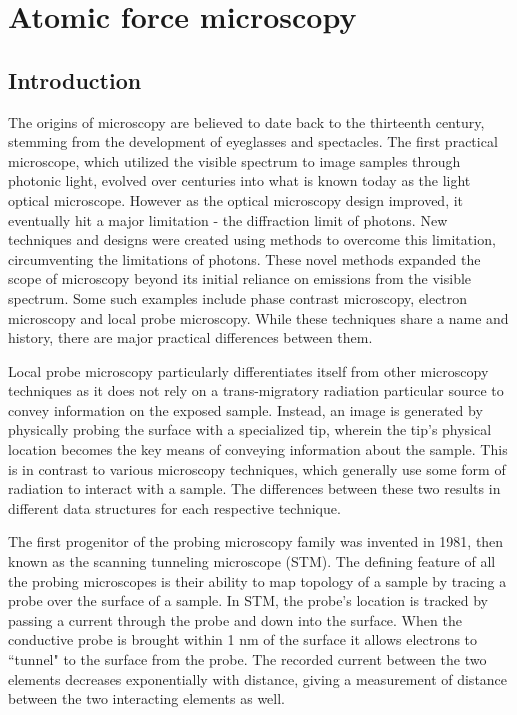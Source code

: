 \chapter{Atomic force microscopy}


\section{Introduction}
The origins of microscopy are believed to date back to the thirteenth century, stemming from the development of eyeglasses and spectacles. The first practical microscope, which utilized the visible spectrum to image samples through photonic light, evolved over centuries into what is known today as the light optical microscope. However as the optical microscopy design improved, it eventually hit a major limitation - the diffraction limit of photons. New techniques and designs were created using methods to overcome this limitation, circumventing the limitations of photons. These novel methods expanded the scope of microscopy beyond its initial reliance on emissions from the visible spectrum. Some such examples include phase contrast microscopy, electron microscopy and local probe microscopy. While these techniques share a name and history, there are major practical differences between them.

Local probe microscopy particularly differentiates itself from other microscopy techniques as it does not rely on a trans-migratory radiation particular source to convey information on the exposed sample. Instead, an image is generated by physically probing the surface with a specialized tip, wherein the tip's physical location becomes the key means of conveying information about the sample. This is in contrast to various microscopy techniques, which generally use some form of radiation to interact with a sample. The differences between these two results in different data structures for each respective technique. \cite{giesbers2001surface}

The first progenitor of the probing microscopy family was invented in 1981, then known as the scanning tunneling microscope (STM). The defining feature of all the probing microscopes is their ability to map topology of a sample by tracing a probe over the surface of a sample. In STM, the probe's location is tracked by passing a current through the probe and down into the surface. When the conductive probe is  brought within 1 nm of the surface it allows electrons to ``tunnel" to the surface from the probe. The recorded current between the two elements decreases exponentially with distance, giving a measurement of distance between the two interacting elements as well. 


